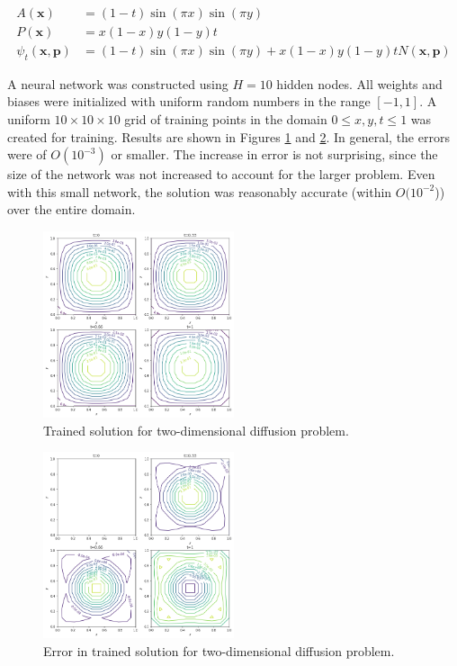 \documentclass{article}
\begin{document}
\begin{equation}
\begin{split}
  A(\mathbf x) &= (1 - t)\sin(\pi x) \sin(\pi y) \\
  P(\mathbf x) &= x(1 - x)y(1 - y)t \\
  \psi_t(\mathbf x,\mathbf p) &= (1 - t)\sin(\pi x) \sin(\pi y) + x(1 - x)y(1 - y)t N(\mathbf x,\mathbf p)
\end{split}
\end{equation}

A neural network was constructed using $H=10$ hidden nodes. All weights and biases were initialized with uniform random numbers in the range $[-1,1]$. A uniform $10\times10\times10$ grid of training points in the domain $0 \leq x,y,t \leq 1$ was created for training. Results are shown in Figures \ref{fig:diff2d_trained} and \ref{fig:diff2d_error}. In general, the errors were of $O(10^{-3})$ or smaller. The increase in error is not surprising, since the size of the network was not increased to account for the larger problem. Even with this small network, the solution was reasonably accurate (within $O(10^{-2}$)) over the entire domain.

\begin{figure}
\centering
\includegraphics[width=0.5\textwidth]{figures/diff2d_trained.png}
\caption{Trained solution for two-dimensional diffusion problem.}
\label{fig:diff2d_trained}
\end{figure}

\begin{figure}
\centering
\includegraphics[width=0.5\textwidth]{figures/diff2d_error.png}
\caption{Error in trained solution for two-dimensional diffusion problem.}
\label{fig:diff2d_error}
\end{figure}
\end{document}
